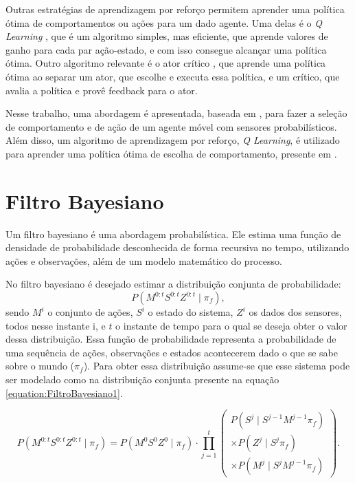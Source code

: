 Outras estratégias de aprendizagem por reforço permitem aprender uma política ótima de comportamentos ou ações para um dado agente. Uma delas é o \textit{Q Learning} \cite{sutton1998reinforcement,KLMSurvey}, que é um algoritmo simples, mas eficiente, que aprende valores de ganho para cada par ação-estado, e com isso consegue alcançar uma política ótima. Outro algoritmo relevante é o ator crítico \cite{sutton1998reinforcement,RicAbeYu07,conf:nips:BhatnagarSGL07,Konda01actor-criticalgorithms}, que aprende uma política ótima ao separar um ator, que escolhe e executa essa política, e um crítico, que avalia a política e provê feedback para o ator.

Nesse trabalho, uma abordagem é apresentada, baseada em \cite{Koike:2005,lidoris2008}, para fazer a seleção de comportamento e de ação de um agente móvel com sensores probabilísticos. Além disso, um algoritmo de aprendizagem por reforço, \textit{Q Learning}, é utilizado para aprender uma política ótima de escolha de comportamento, presente em \cite{sutton1998reinforcement}.


\section{Filtro Bayesiano} \label{section:FiltroBayesiano}

Um filtro bayesiano é uma abordagem probabilística. Ele estima uma função de densidade de probabilidade desconhecida de forma recursiva no tempo, utilizando ações e observações, além de um modelo matemático do processo.

No filtro bayesiano é desejado estimar a distribuição conjunta de probabilidade:
\begin{equation} \label{equation:DistribuicaoConjuntaProbabilistica}
	P ( M^{0: t} S^{0: t} Z^{0: t} \mid \pi_f ),
\end{equation}
sendo $ M^i $ o conjunto de ações, $ S^i $ o estado do sistema, $ Z^i $ os dados dos sensores, todos nesse instante i, e $ t $ o instante de tempo para o qual se deseja obter o valor dessa distribuição. Essa função de probabilidade representa a probabilidade de uma sequência de ações, observações e estados acontecerem dado o que se sabe sobre o mundo ($ \pi_f $). Para obter essa distribuição assume-se que esse sistema pode ser modelado como na distribuição conjunta presente na equação \ref{equation:FiltroBayesiano1}.

\begin{equation} \label{equation:FiltroBayesiano1}
        P ( M^{0: t} S^{0: t} Z^{0: t} \mid \pi_f ) = P ( M^0 S^0 Z^0 \mid \pi_f ) \cdot \prod\limits_{j =1}^{t} 
        \left(
            \begin{array}{l}
                P( S^j \mid S^{j -1} M^{j -1} \pi_f ) \\
                \times P( Z^j \mid S^j \pi_f ) \\
                \times P( M^j \mid S^j M^{j -1} \pi_f )
            \end{array}
        \right).
\end{equation}

